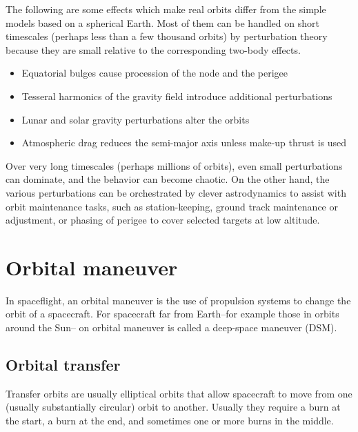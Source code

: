 \documentclass[12pt]{article}
\begin{document}
The following are some effects which make real orbits differ from the simple
models based on a spherical Earth. Most of them can be handled on short
timescales (perhaps less than a few thousand orbits) by perturbation theory
because they are small relative to the corresponding two-body effects.

\begin{itemize}
  \item Equatorial bulges cause procession of the node and the perigee
  \item Tesseral harmonics of the gravity field introduce additional
    perturbations
  \item Lunar and solar gravity perturbations alter the orbits
  \item Atmospheric drag reduces the semi-major axis unless make-up thrust is
    used
\end{itemize}

Over very long timescales (perhaps millions of orbits), even small
perturbations can dominate, and the behavior can become chaotic. On the other
hand, the various perturbations can be orchestrated by clever astrodynamics to
assist with orbit maintenance tasks, such as station-keeping, ground track
maintenance or adjustment, or phasing of perigee to cover selected targets at
low altitude.

\section{Orbital maneuver}

In spaceflight, an orbital maneuver is the use of propulsion systems to change
the orbit of a spacecraft. For spacecraft far from Earth--for example those in
orbits around the Sun-- on orbital maneuver is called a deep-space maneuver
(DSM).

\subsection{Orbital transfer}

Transfer orbits are usually elliptical orbits that allow spacecraft to move
from one (usually substantially circular) orbit to another. Usually they
require a burn at the start, a burn at the end, and sometimes one or more burns
in the middle.
\end{document}
